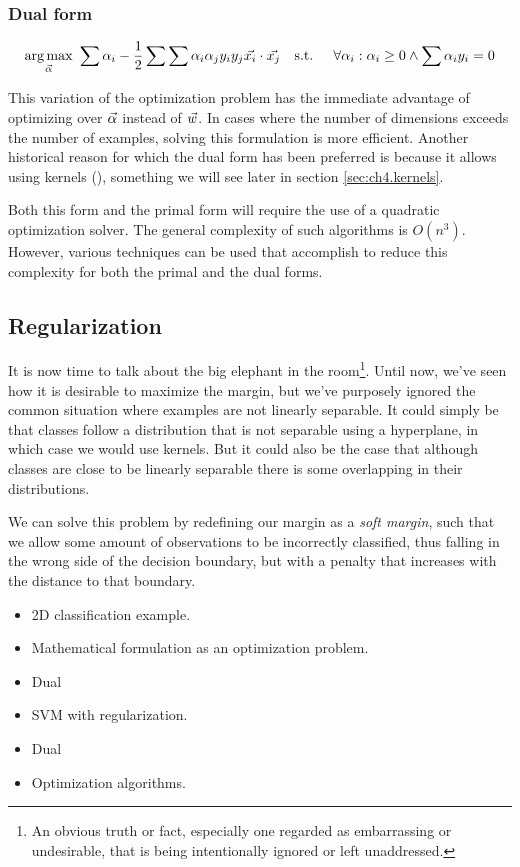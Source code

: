 \subsubsection*{Dual form}
\begin{align}
    \underset{\vec{\alpha}}{\text{arg} \max}\ \sum \alpha_i - \frac{1}{2} \sum \sum \alpha_i \alpha_j y_i y_j \vec{x_i} \cdot \vec{x_j}
    \text{\quad s.t. \quad} \forall \alpha_i : \alpha_i \ge 0 \land \sum \alpha_i y_i = 0
\end{align}

This variation of the optimization problem has the immediate advantage of op\-ti\-miz\-ing over $\vec{\alpha}$ instead of $\vec{w}$. In cases where the number of dimensions exceeds the number of examples, solving this formulation is more efficient. Another historical reason for which the dual form has been preferred is because it allows using kernels (\cite{chapelle_training_2007}), something we will see later in section \ref{sec:ch4.kernels}.

Both this form and the primal form will require the use of a quadratic op\-ti\-miza\-tion solver. The general complexity of such algorithms is $O(n^3)$. However, various techniques can be used that accomplish to reduce this complexity for both the primal and the dual forms.

\subsection{Regularization}

It is now time to talk about the big elephant in the room\footnote{An obvious truth or fact, especially one regarded as embarrassing or undesirable, that is being intentionally ignored or left unaddressed.}. Until now, we've seen how it is desirable to maximize the margin, but we've purposely ignored the common situation where examples are not linearly separable. It could simply be that classes follow a distribution that is not separable using a hyperplane, in which case we would use kernels. But it could also be the case that although classes are close to be linearly separable there is some overlapping in their distributions.  

We can solve this problem by redefining our margin as a \emph{soft margin}, such that we allow some amount of observations to be incorrectly classified, thus falling in the wrong side of the decision boundary, but with a penalty that increases with the distance to that boundary. 

\begin{itemize}
    \item 2D classification example.
    \item Mathematical formulation as an optimization problem.
    \item Dual
    \item SVM with regularization.
    \item Dual
    \item Optimization algorithms.
\end{itemize}


